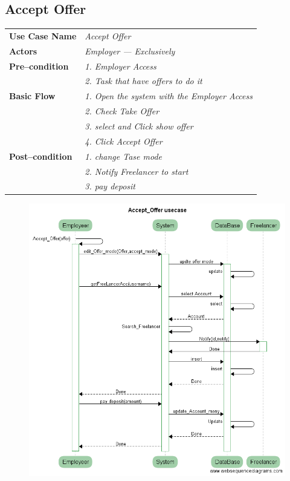 \documentclass{article}
\begin{document}
\subsection{Accept Offer}
    \begin{tabular}{ l | l }
    \toprule
      \rowcolor{LightCyan}
      \textbf{Use Case Name}    & \textit{Accept Offer}\\
      \textbf{Actors}           & \textit{Employer --- Exclusively}\\
      \rowcolor{LightCyan}
      \textbf{Pre--condition}   & \textit{1. Employer Access}\\
                                & \textit{2. Task that have offers to do it}\\
      \textbf{Basic Flow}       & \textit{1. Open the system with the Employer Access}\\
                                & \textit{2. Check Take Offer}\\
                                & \textit{3. select and Click show offer}\\
				& \textit{4. Click Accept Offer}\\

      \rowcolor{LightCyan}
      \textbf{Post--condition}  & \textit{1. change Tase mode}\\
                                & \textit{2. Notify Freelancer to start}\\
                                & \textit{3. pay deposit}\\
    \toprule
    \end{tabular}

\begin{figure}[ht!]
\centering
\includegraphics[width=128mm]{Accept_Offer usecase.png}
\end{figure}
\end{document}
